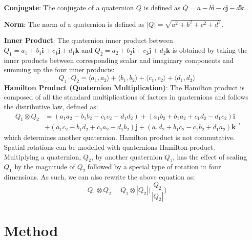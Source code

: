 \documentclass{article}
\begin{document}
\textbf{Conjugate}: The conjugate of a quaternion $Q$ is defined as $\bar{Q} = a - b\textbf{i} - c\textbf{j}  - d\textbf{k}$.

\textbf{Norm}: The norm of a quaternion is defined as $|Q| =  \sqrt{a^2 + b^2 + c^2 + d^2}$.



\textbf{Inner Product}: The quaternion inner product between $Q_1 = a_1 + b_1 \textbf{i} + c_1 \textbf{j} + d_1 \textbf{k}$ and $Q_2 = a_2 + b_2 \textbf{i} + c_2 \textbf{j} + d_2 \textbf{k}$ is obtained by taking the inner products between corresponding scalar and imaginary components and summing up the four inner products:
    \begin{equation}
    Q_1 \cdot Q_2 = \langle a_1, a_2\rangle + \langle b_1,  b_2\rangle + \langle c_1, c_2\rangle + \langle d_1, d_2\rangle
    \end{equation}
\textbf{Hamilton Product (Quaternion Multiplication)}:  The Hamilton product is composed of all the standard multiplications of factors in quaternions and follows the distributive law, defined as:
\begin{equation}
    \begin{split}
     Q_1 \otimes Q_2 &= (a_1 a_2 - b_1 b_2 -c_1 c_2 -d_1 d_2)
     + (a_1 b_2 + b_1 a_2 + c_1 d_2 - d_1 c_2 ) \textbf{i} \\
     &+ (a_1 c_2 -b_1 d_2 + c_1 a_2 + d_1 b_2 ) \textbf{j}
     + (a_1 d_2 + b_1 c_2 - c_1 b_2 +d_1 a_2 ) \textbf{k}
    \end{split},
\end{equation}
which determines another quaternion. Hamilton product is not commutative. Spatial rotations can be modelled with quaternions Hamilton product. Multiplying a quaternion, $Q_2$, by another quaternion $Q_1$, has the effect of scaling $Q_1$ by the magnitude of $Q_2$ followed by a special type of rotation in four dimensions.  As such, we can also rewrite the above equation as:
\begin{equation}
     Q_1 \otimes Q_2 = Q_1 \otimes |Q_2| \Big(\frac{Q_2}{|Q_2|} \Big)
\end{equation}




\section{Method}
\end{document}
